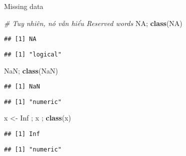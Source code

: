 \documentclass[
  ignorenonframetext,
]{beamer}
\newenvironment{Shaded}{}{}
\newcommand{\CommentTok}[1]{\textcolor[rgb]{0.38,0.63,0.69}{\textit{#1}}}
\newcommand{\KeywordTok}[1]{\textcolor[rgb]{0.00,0.44,0.13}{\textbf{#1}}}
\newcommand{\NormalTok}[1]{#1}
\newcommand{\OtherTok}[1]{\textcolor[rgb]{0.00,0.44,0.13}{#1}}
\newcommand{\StringTok}[1]{\textcolor[rgb]{0.25,0.44,0.63}{#1}}
\begin{document}
\begin{frame}[fragile]{Missing data}
\protect\hypertarget{missing-data-2}{}

\begin{Shaded}
\begin{Highlighting}[]
\CommentTok{# Tuy nhiên, nó vẫn hiểu Reserved words}
\OtherTok{NA}\NormalTok{; }\KeywordTok{class}\NormalTok{(}\OtherTok{NA}\NormalTok{)}
\end{Highlighting}
\end{Shaded}

\begin{verbatim}
## [1] NA
\end{verbatim}

\begin{verbatim}
## [1] "logical"
\end{verbatim}

\begin{Shaded}
\begin{Highlighting}[]
\OtherTok{NaN}\NormalTok{; }\KeywordTok{class}\NormalTok{(}\OtherTok{NaN}\NormalTok{)}
\end{Highlighting}
\end{Shaded}

\begin{verbatim}
## [1] NaN
\end{verbatim}

\begin{verbatim}
## [1] "numeric"
\end{verbatim}

\begin{Shaded}
\begin{Highlighting}[]
\NormalTok{x <-}\StringTok{ }\OtherTok{Inf}\NormalTok{ ; x ; }\KeywordTok{class}\NormalTok{(x)}
\end{Highlighting}
\end{Shaded}

\begin{verbatim}
## [1] Inf
\end{verbatim}

\begin{verbatim}
## [1] "numeric"
\end{verbatim}

\end{frame}
\end{document}
